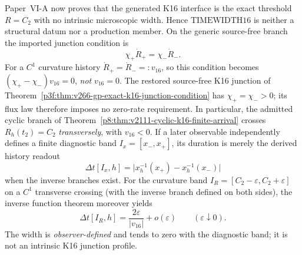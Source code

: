 \documentclass[12pt,a4paper]{article}
\begin{document}
\begin{corollary}[No independent \(K=16\) physical-time width]
\label{p9:cor:k16-timewidth-retired}
Paper~VI-A now proves that the generated K16 interface is the exact threshold
\(R=C_2\) with no intrinsic microscopic width.  Hence
\(\mathrm{TIMEWIDTH16}\) is neither a structural datum nor a production
member.  On the generic source-free branch the imported junction condition is
\[
 \chi_+\dot R_+=\chi_-\dot R_-.
\]
For a \(C^1\) curvature history \(\dot R_+=\dot R_-=:v_{16}\), so this
condition becomes \((\chi_+-\chi_-)v_{16}=0\), \emph{not} \(v_{16}=0\).
The restored source-free K16 junction of
Theorem~\ref{p3f:thm:v266-gp-exact-k16-junction-condition} has
\(\chi_+=\chi_->0\); its flux law therefore imposes no zero-rate
requirement.  In particular, the admitted cyclic branch of
Theorem~\ref{p8:thm:v2111-cyclic-k16-finite-arrival} crosses
\(R_h(t_2)=C_2\) \emph{transversely}, with \(v_{16}<0\).
If a later observable independently defines a finite diagnostic band
\(I_x=[x_-,x_+]\), its duration is merely the derived history readout
\[
 \Delta t[I_x,h]
 =\bigl|x_h^{-1}(x_+)-x_h^{-1}(x_-)\bigr|
\]
when the inverse branches exist.  For the curvature band
\(I_R=[C_2-\varepsilon,C_2+\varepsilon]\) on a \(C^1\) transverse
crossing (with the inverse branch defined on both sides), the inverse
function theorem moreover yields
\begin{equation}
\label{p9:eq:v1201-transverse-k16-band-clock}
 \Delta t[I_R,h]=\frac{2\varepsilon}{|v_{16}|}+o(\varepsilon)
 \qquad(\varepsilon\downarrow0).
\end{equation}
The width is \emph{observer-defined} and tends to zero with the diagnostic
band; it is not an intrinsic K16 junction profile.
\end{corollary}
\end{document}
